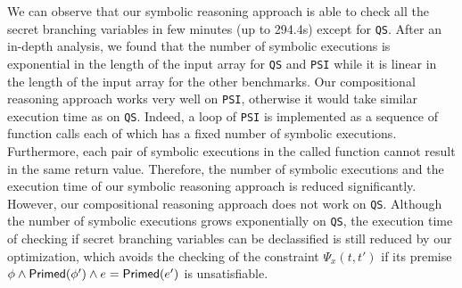 
We can observe that our symbolic reasoning approach is able to check
all the secret branching variables in few minutes (up to 294.4s)
except for {\tt QS}.
After an in-depth analysis, we found that the number of symbolic executions is exponential in the length
of the input array for {\tt QS} and {\tt PSI}
while it is linear in the length of the input array for the other benchmarks.
Our compositional reasoning approach works very well
on {\tt PSI}, otherwise it would take similar execution time
as on {\tt QS}. Indeed, a loop of {\tt PSI} is implemented as a sequence of function calls each of which has a fixed number of symbolic executions.
Furthermore, each pair of symbolic executions in the called function cannot result in the same return value.
Therefore, the number of symbolic executions and the execution time of our symbolic reasoning approach is reduced significantly.
However, our compositional reasoning approach does not work
on {\tt QS}. Although the number of symbolic executions grows exponentially on {\tt QS},
the execution time of checking if secret branching variables can be declassified
is still reduced by our optimization, which avoids the checking of the constraint $\Psi_x(t,t')$
if its premise $\phi\wedge {\sf Primed}(\phi')\wedge e={\sf Primed}(e')$ is unsatisfiable.


